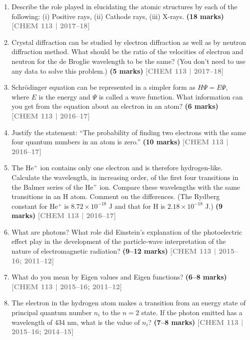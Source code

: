 \documentclass[12pt,a3paper]{article}
\newcommand{\yr}[1]{\hfill\textcolor{gray}{\small\textbf{[#1]}}}
\newcommand{\mk}[1]{\textcolor{orange!70!black}{\small\textbf{(#1 marks)}}}
\begin{document}
\begin{enumerate}
\item Describe the role played in elucidating the atomic structures by each of the following: (i) Positive rays, (ii) Cathode rays, (iii) X-rays. \mk{18}
\yr{CHEM 113 | 2017--18}



\item Crystal diffraction can be studied by electron diffraction as well as by neutron diffraction method. What should be the ratio of the velocities of electron and neutron for the de Broglie wavelength to be the same? (You don't need to use any data to solve this problem.) \mk{5}
\yr{CHEM 113 | 2017--18}



\item Schr\"{o}dinger equation can be represented in a simpler form as $H\Psi = E\Psi$, where $E$ is the energy and $\Psi$ is called a wave function. What information can you get from the equation about an electron in an atom? \mk{6}
\yr{CHEM 113 | 2016--17}



\item Justify the statement: ``The probability of finding two electrons with the same four quantum numbers in an atom is zero.'' \mk{10}
\yr{CHEM 113 | 2016--17}



\item The He$^+$ ion contains only one electron and is therefore hydrogen-like. Calculate the wavelength, in increasing order, of the first four transitions in the Balmer series of the He$^+$ ion. Compare these wavelengths with the same transitions in an H atom. Comment on the differences. (The Rydberg constant for He$^+$ is $8.72 \times 10^{-18}$ J and that for H is $2.18 \times 10^{-18}$ J.) \mk{9}
\yr{CHEM 113 | 2016--17}



\item What are photons? What role did Einstein's explanation of the photoelectric effect play in the development of the particle-wave interpretation of the nature of electromagnetic radiation? \mk{9--12}
\yr{CHEM 113 | 2015--16; 2011--12}



\item What do you mean by Eigen values and Eigen functions? \mk{6--8}
\yr{CHEM 113 | 2015--16; 2011--12}



\item The electron in the hydrogen atom makes a transition from an energy state of principal quantum number $n_i$ to the $n=2$ state. If the photon emitted has a wavelength of 434 nm, what is the value of $n_i$? \mk{7--8}
\yr{CHEM 113 | 2015--16; 2014--15}




\end{enumerate}
\end{document}
